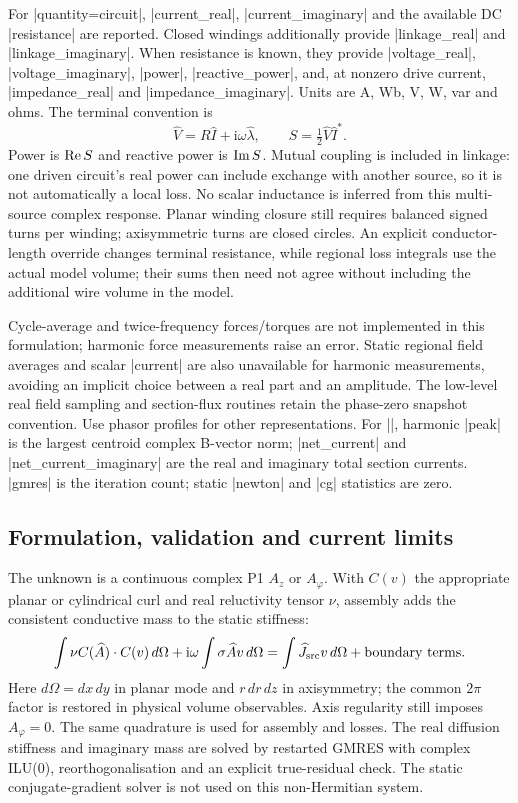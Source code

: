 For |quantity=circuit|, |current_real|, |current_imaginary| and the available DC
|resistance| are reported. Closed windings additionally provide |linkage_real|
and |linkage_imaginary|. When resistance is known, they provide |voltage_real|,
|voltage_imaginary|, |power|, |reactive_power|, and, at nonzero drive current,
|impedance_real| and |impedance_imaginary|. Units are A, Wb, V, W, var and ohms.
The terminal convention is
\[
 \widehat V=R\widehat I+\mathrm{i}\omega\widehat\lambda,\qquad
 S=\tfrac12\widehat V\widehat I^{*}.
\]
Power is $\mathop{\rm Re}S$ and reactive power is $\mathop{\rm Im}S$.
Mutual coupling is included in linkage: one driven circuit's real power can
include exchange with another source, so it is not automatically a local loss.
No scalar inductance is inferred from this multi-source complex response.
Planar winding closure still requires balanced signed turns per winding;
axisymmetric turns are closed circles. An explicit conductor-length override
changes terminal resistance, while regional loss integrals use the actual
model volume; their sums then need not agree without including the additional
wire volume in the model.

Cycle-average and twice-frequency forces/torques are not implemented in this
formulation; harmonic force measurements raise an error. Static regional field
averages and scalar |current| are also unavailable for harmonic measurements,
avoiding an implicit choice between a real part and an amplitude.
The low-level real field sampling and section-flux routines retain the
phase-zero snapshot convention. Use phasor profiles for other representations.
For |\femmstat|, harmonic |peak| is the largest centroid complex B-vector norm;
|net_current| and |net_current_imaginary| are the real and imaginary total
section currents. |gmres| is the iteration count; static |newton| and |cg|
statistics are zero.

\subsection{Formulation, validation and current limits}
The unknown is a continuous complex P1 $A_z$ or $A_\varphi$. With $C(v)$ the
appropriate planar or cylindrical curl and real reluctivity tensor $\nu$,
assembly adds the consistent conductive mass to the static stiffness:
\[
 \int \nu C(\widehat A)\mathbin{\cdot}C(v)\,d\Omega
 +\mathrm{i}\omega\int\sigma\widehat A v\,d\Omega
 =\int\widehat J_{\rm src}v\,d\Omega+\hbox{boundary terms}.
\]
Here $d\Omega=dx\,dy$ in planar mode and $r\,dr\,dz$ in axisymmetry; the common
$2\pi$ factor is restored in physical volume observables. Axis regularity
still imposes $A_\varphi=0$. The same quadrature is used for assembly and losses.
The real diffusion stiffness and imaginary mass are solved by restarted GMRES
with complex ILU(0), reorthogonalisation and an explicit true-residual check.
The static conjugate-gradient solver is not used on this non-Hermitian system.

